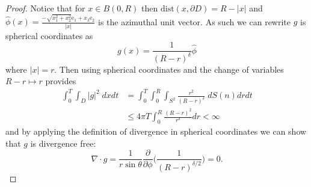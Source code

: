\documentclass[11pt, reqno]{article}
\def\grad{\nabla}
\newcommand{\pd}[2]{\frac{\partial #1}{\partial #2}}
\def\dist{\mathrm{dist}}
\begin{document}
\begin{proof}
    Notice that for $x \in B(0,R)$ then $\dist(x, \partial D) = R - |x|$ and $\widehat{\phi}(x) = \frac{-\sqrt{x_1^2 + x_2^2}\mathrm{e}_1 + x_3\mathrm{e}_2}{|x|}$ is the azimuthal unit vector. As such we can rewrite $g$ is spherical coordinates as 
    \[
        g(x) = \frac{1}{(R-r)^\delta}\widehat{\phi}
    \]
    where $|x| = r$. Then using spherical coordinates and the change of variables $R - r \mapsto r$ provides
    \begin{align*}
        \int_0^T\int_D|g|^2\;dxdt &= \int_0^T\int_0^R \int_{S^2}\frac{r^2}{(R - r)^\delta}\;dS(n)drdt\\
        &\leq 4\pi T\int_0^R \frac{(R-r)^2}{r^\delta}dr < \infty
    \end{align*}
    and by applying the definition of divergence in spherical coordinates we can show that $g$ is divergence free:
    \[
        \grad \cdot g = \frac{1}{r\sin\theta}\pd{}{\phi}\Big(\frac{1}{(R - r)^{\delta/2}}\Big)= 0. 
    \]
    

\end{proof}
\end{document}
